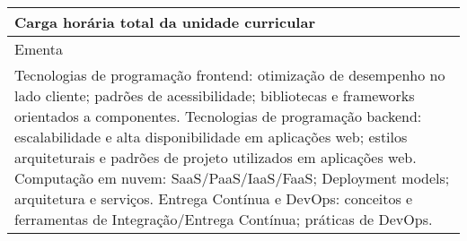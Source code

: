 \begin{quadro}[ht!]
\begin{tabular}{|p{3cm} p{2cm} p{3cm} p{2cm} p{3cm} p{2cm}|}
\multicolumn{5}{|p{13cm}|}{\cellcolor{blue1} Carga horária total da unidade curricular} & \multicolumn{1}{p{1cm}|}{\raggedleft 60	}\\\hline
\multicolumn{6}{|p{15cm}|}{\cellcolor{blue1} Ementa} \\\hline
\hline\multicolumn{6}{|p{15cm}|}{\scriptsize Tecnologias de programação frontend: otimização de desempenho no lado cliente; padrões de acessibilidade; bibliotecas e frameworks orientados a componentes. Tecnologias de programação backend: escalabilidade e alta disponibilidade em aplicações web; estilos arquiteturais e padrões de projeto utilizados em aplicações web. Computação em nuvem: SaaS/PaaS/IaaS/FaaS; Deployment models; arquitetura e serviços. Entrega Contínua e DevOps: conceitos e ferramentas de Integração/Entrega Contínua; práticas de DevOps.}\\\hline
\hline
	\end{tabular}
\end{quadro}
